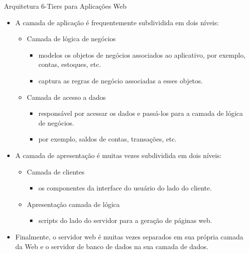 \begin{frame}{Arquitetura 6-Tiers para Aplicações Web }
  \begin{itemize}
    \item A camada de aplicação é frequentemente subdividida em dois níveis:
    \begin{itemize} 
      \item Camada de lógica de negócios
      \begin{itemize}
	\item modelos os \alert{objetos de negócios} associados ao aplicativo, por exemplo, contas, estoques, etc.
	\item captura as regras de negócio associadas a esses objetos.     
       \end{itemize}      
      \item Camada de acesso a dados
      \begin{itemize}
	\item responsável por acessar os dados e passá-los para a camada de lógica de negócios.
	\item por exemplo, saldos de contas, transações, etc.
      \end{itemize}
    \end{itemize}
    \item A camada de apresentação é muitas vezes subdividida em dois níveis: 
    \begin{itemize}
      \item Camada de clientes
      \begin{itemize}
	\item os componentes da interface do usuário do lado do cliente.
      \end{itemize}
      
      \item Apresentação camada de lógica
      \begin{itemize}
       \item scripts do lado do servidor para a geração de páginas web. 
      \end{itemize}

    \end{itemize}
    \item Finalmente, o servidor web é muitas vezes separados em sua própria camada da Web e o
    servidor de banco de dados na sua camada de dados.
  \end{itemize}
  

\end{frame}
